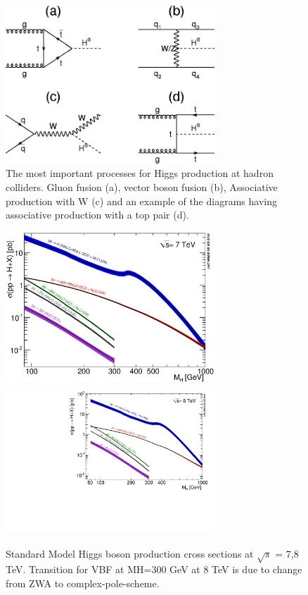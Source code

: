 \begin{figure}[htb]
\centering
\includegraphics[width=0.7\textwidth]{StandardModel/feynman_higgs_production.jpg}
\caption{\small The most important processes for Higgs production at hadron colliders. Gluon fusion (a), vector boson fusion (b), Associative production with W (c) and an example of the diagrams having associative production with a top pair (d). ~\cite{Egede_Feynman_Higgs}
         }
\label{fig:Higgs_Feynman_diag}
\end{figure}


\begin{figure}[htb]
\centering
\includegraphics[width=0.7\textwidth]{StandardModel/Higgs_XS_7TeV.eps}
\includegraphics[width=0.7\textwidth]{StandardModel/Higgs_XS_8TeV_lx.pdf}
\caption{\small Standard Model Higgs boson production cross sections at $\sqrt{s}$ = 7,8 TeV. Transition for VBF at MH=300 GeV at 8 TeV is due to change from ZWA to complex-pole-scheme.~\cite{LHC_Higgs_Gallery}
         }
\label{fig:LHC_higgs_production}
\end{figure}

